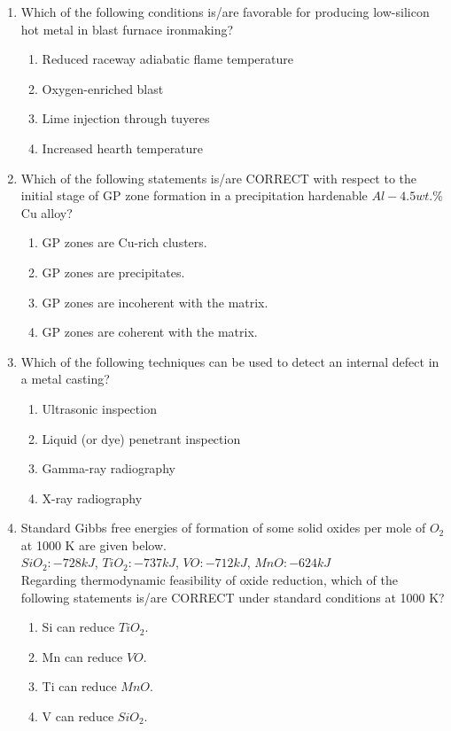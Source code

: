 \documentclass[journal]{IEEEtran}
\theoremstyle{remark}
\begin{document}
\begin{enumerate}[resume]
\item Which of the following conditions is/are favorable for producing low-silicon hot metal in blast furnace ironmaking? \hfill{}
\begin{enumerate}
\item Reduced raceway adiabatic flame temperature
\item Oxygen-enriched blast
\item Lime injection through tuyeres
\item Increased hearth temperature
\end{enumerate}

\item Which of the following statements is/are CORRECT with respect to the initial stage of GP zone formation in a precipitation hardenable $Al - 4.5 wt.\%$ Cu alloy? \hfill{}
\begin{enumerate}
\item GP zones are Cu-rich clusters.
\item GP zones are  precipitates.
\item GP zones are incoherent with the matrix.
\item GP zones are coherent with the matrix.
\end{enumerate}

\item Which of the following techniques can be used to detect an internal defect in a metal casting? \hfill{}
\begin{enumerate}
\item Ultrasonic inspection
\item Liquid (or dye) penetrant inspection
\item Gamma-ray radiography
\item X-ray radiography
\end{enumerate}

\item Standard Gibbs free energies of formation of some solid oxides per mole of $O_2$ at 1000 K are given below. \hfill{} \\
$SiO_2: -728 kJ$, $TiO_2: -737 kJ$, $VO: -712 kJ$, $MnO: -624 kJ$ \\
Regarding thermodynamic feasibility of oxide reduction, which of the following statements is/are CORRECT under standard conditions at 1000 K?
\begin{enumerate}
\item Si can reduce $TiO_2$.
\item Mn can reduce $VO$.
\item Ti can reduce $MnO$.
\item V can reduce $SiO_2$.
\end{enumerate}


\end{enumerate}
\end{document}
